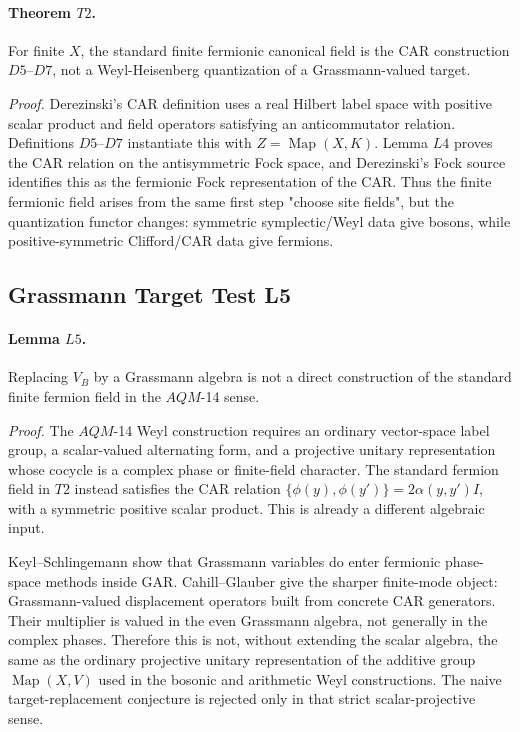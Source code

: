 \paragraph{Theorem \(T2\).}
For finite \(X\), the standard finite fermionic canonical field is the CAR
construction \(D5\)--\(D7\), not a Weyl-Heisenberg quantization of a
Grassmann-valued target.

\emph{Proof.}
Derezinski's CAR definition uses a real Hilbert label space with positive
scalar product and field operators satisfying an anticommutator relation.
Definitions \(D5\)--\(D7\) instantiate this with \(Z=\operatorname{Map}(X,K)\).
Lemma \(L4\) proves the CAR relation on the antisymmetric Fock space, and
Derezinski's Fock source identifies this as the fermionic Fock representation
of the CAR.  Thus the finite fermionic field arises from the same first step
"choose site fields", but the quantization functor changes: symmetric
symplectic/Weyl data give bosons, while positive-symmetric Clifford/CAR data
give fermions.

\subsection{Grassmann Target Test L5}

\paragraph{Lemma \(L5\).}
Replacing \(V_B\) by a Grassmann algebra is not a direct construction of the
standard finite fermion field in the \(AQM\)-14 sense.

\emph{Proof.}
The \(AQM\)-14 Weyl construction requires an ordinary vector-space label
group, a scalar-valued alternating form, and a projective unitary
representation whose cocycle is a complex phase or finite-field character.
The standard fermion field in \(T2\) instead satisfies the CAR relation
\(\{\phi(y),\phi(y')\}=2\alpha(y,y')I\), with a symmetric positive scalar
product.  This is already a different algebraic input.

Keyl--Schlingemann show that Grassmann variables do enter fermionic phase-space
methods inside GAR.  Cahill--Glauber give the sharper finite-mode object:
Grassmann-valued displacement operators built from concrete CAR generators.
Their multiplier is valued in the even Grassmann algebra, not generally in the
complex phases.  Therefore this is not, without extending the scalar algebra,
the same as the ordinary projective unitary representation of the additive
group \(\operatorname{Map}(X,V)\) used in the bosonic and arithmetic Weyl
constructions.  The naive target-replacement conjecture is rejected only in
that strict scalar-projective sense.

